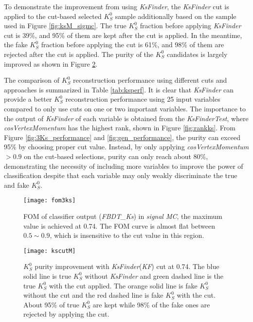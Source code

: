 
To demonstrate the improvement from using \textit{KsFinder}, the \textit{KsFinder} cut is applied to the cut-based selected $K_S^0$ sample additionally based on the sample used in Figure \ref{fig:ksM_sigmc}.  The true $K_S^0$ fraction before applying \textit{KsFinder} cut is 39\%, and 95\% of them are kept after the cut is applied. In the meantime, the fake $K_S^0$ fraction before applying the cut is 61\%, and 98\% of them are rejected after the cut is applied. The purity of the $K_S^0$ candidates is largely improved as shown in Figure \ref{fig:ks_cutused}. 

The comparison of $K_S^0$ reconstruction performance using different cuts and approaches is summarized in Table \ref{tab:ksperf}.  It is clear that \textit{KsFinder} can provide a better $K_S^0$ reconstruction performance using 25 input variables compared to only use cuts on one or two important variables. The importance to the output of \textit{KsFinder} of each variable is obtained from the \textit{KsFinderTest}, where \textit{cosVertexMomentum} has the highest rank, shown in Figure \ref{fig:rankks}. From Figure \ref{fig:3Ks_performance} and \ref{fig:gen_performance}, the purity can exceed 95\% by choosing proper cut value. Instead, by only applying \textit{cosVertexMomentum}$>0.9$ on the cut-based selections, purity can only reach about 80\%, demonstrating the necessity of including more variables to improve the power of classification despite that each variable may only weakly discriminate the true and fake $K_S^0$.


\begin{figure}[htpb]
	\centering
	\texttt{[image: fom3ks]}
	\caption{FOM of classifier output (\textit{FBDT\_Ks}) in \textit{signal MC}, the maximum value is achieved at 0.74. The FOM curve is almost flat between $0.5\sim 0.9$, which is insensitive to the cut value in this region.} 
	\label{fig:ks_fom}
\end{figure}





\begin{figure}[htpb]
	\centering
	\texttt{[image: kscutM]}
	\caption{$K_S^0$ purity improvement with \textit{KsFinder}(\textit{KF}) cut at 0.74. The blue solid line is true $K_S^0$ without \textit{KsFinder} and green dashed line is the true $K_S^0$ with the cut applied. The orange solid line is fake $K_S^0$ without the cut and the red dashed line is fake $K_S^0$ with the cut. About 95\% of true $K_S^0$ are kept while 98\% of the fake ones are rejected by applying the cut.}
	\label{fig:ks_cutused}
\end{figure}

